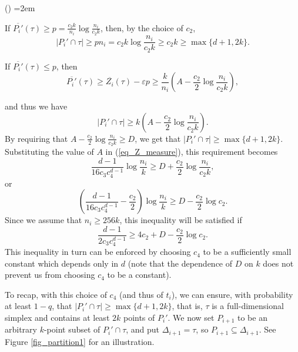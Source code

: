 \documentclass[11pt]{article}
\newcounter{itemcounter}
\def\eps{\varepsilon}
\begin{document}
\begin{list} {()}{ \leftmargin=2em}
\item If $\overline{P_{i}'}(\tau) \geq p = \frac{c_{2}k}{n_{i}} \log \frac{n_{i}}{c_{2}k}$, then, by the choice of $c_{2}$,
$$
|P_{i}' \cap \tau | \geq p n_{i} = c_{2}k \log \frac{n_{i}}{c_{2}k} \geq c_{2}k \geq \max \{d+1,2k\}.
$$
\item If $\overline{P_{i}'}(\tau) \leq p$, then
$$
\overline{P_{i}'}(\tau) \geq \overline{Z_{i}}(\tau) - \eps p \geq
\frac{k}{n_{i}} \left(A - \frac{c_{2}}{2}\log \frac{n_{i}}{c_{2}k}\right),
$$
\end{list}
and thus we have
$$
|P_{i}' \cap \tau | \geq k \left(A - \frac{c_{2}}{2}\log \frac{n_{i}}{c_{2}k}\right).
$$
By requiring that $A - \frac{c_{2}}{2}\log \frac{n_{i}}{c_{2}k} \geq D$, we get that $|P_{i}' \cap \tau| \geq \max\{d+1,2k\}$. Substituting the value of $A$ in (\ref{eq_Z_measure}), this requirement becomes
$$
\frac{d-1}{16 c_{3}c_{4}^{d-1}} \log \frac{n_{i}}{k} \geq D + \frac{c_{2}}{2}\log \frac{n_{i}}{c_{2}k},
$$
or
$$
\left(\frac{d-1}{16 c_{3}c_{4}^{d-1}} - \frac{c_{2}}{2}\right) \log \frac{n_{i}}{k} \geq D - \frac{c_2}{2}\log c_{2}.
$$
Since we assume that $n_{i} \geq 256 k$, this inequality will be satisfied if
\begin{equation} \label{eq_partition_constants}
\frac{d-1}{2 c_{3}c_{4}^{d-1}} \geq 4c_{2} + D - \frac{c_{2}}{2}\log c_{2}.
\end{equation}
This inequality in turn can be enforced by choosing $c_{4}$ to be a sufficiently small constant which depends only in $d$ (note that the dependence of $D$ on $k$ does not prevent us from choosing $c_{4}$ to be a constant).

To recap, with this choice of $c_{4}$ (and thus of $t_{i}$), we can ensure, with probability at least $1 - q$, that $|P_{i}' \cap \tau| \geq \max\{d+1,2k\}$, that is, $\tau$ is a full-dimensional simplex and contains at least $2k$ points of $P_{i}'$. We now set $P_{i+1}$ to be an arbitrary $k$-point subset of $P_{i}' \cap \tau$, and put $\Delta_{i+1} = \tau$, so $P_{i+1} \subseteq \Delta_{i+1}$. See Figure \ref{fig_partition1} for an illustration.
\end{document}
